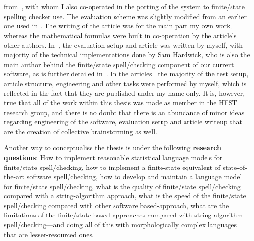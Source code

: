\documentclass[officiallayout]{unihelcompling}
\begin{document}
from~\citet{silfverberg2010partofspeech}, with whom I also co-operated in the
porting of the system to finite\-/state spelling checker use. The evaluation
scheme was slightly modified from an earlier one used in
. The writing of the article
 was for the main part  my own work, whereas
the mathematical formulas were built in co-operation by the article's other
authors.  In~, the evaluation setup and article
was written by myself, with majority of the technical implementations done by
Sam Hardwick, who is also the main author behind the finite\-/state
spell\-/checking component of our current software, as is further detailed
in~\citet{linden2011hfst}.  In the
articles~ the majority
of the test setup, article structure, engineering and other tasks were
performed by myself, which is reflected in the fact that they are published
under my name only. It is, however, true that all of the work within this
thesis was made as member in the HFST research group, and there is no doubt
that there is an abundance of minor ideas regarding engineering of the
software, evaluation setup and article writeup that are the creation of
collective brainstorming as well.

Another way to conceptualise the thesis is under the following \textbf{research
questions}: How to implement reasonable statistical language models for
finite\-/state spell\-/checking, how to implement a finite-state equivalent of
state-of-the-art software spell\-/checking, how to develop and maintain a
language model for finite\-/state spell\-/checking, what is the quality of
finite\-/state spell\-/checking compared with a string-algorithm approach, what is the
speed of the finite\-/state spell\-/checking compared with other software
based-approach, what are the limitations of the finite\-/state-based approaches
compared with string-algorithm spell\-/checking---and doing all of this with
morphologically complex languages that are lesser-resourced ones.
\end{document}
